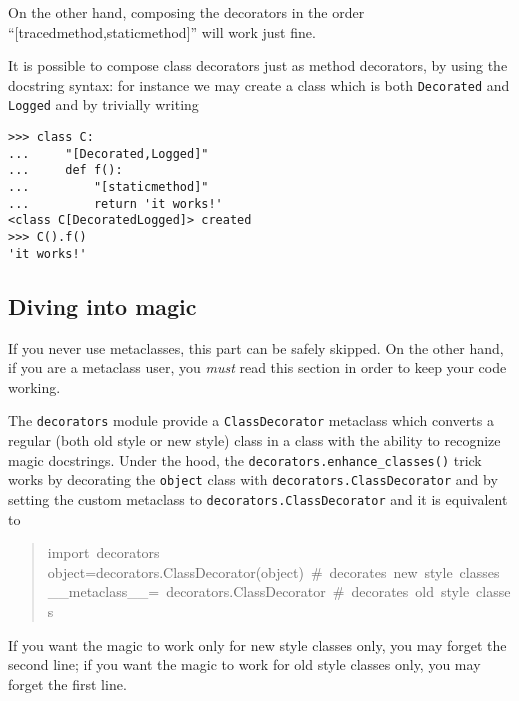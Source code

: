 \documentclass[11pt,english]{article}
\begin{document}
On the other hand, composing the decorators in the order
``[tracedmethod,staticmethod]'' will work just fine.

It is possible to compose class decorators just as method decorators,
by using the docstring syntax: for instance we may create a class
which is both \texttt{Decorated} and \texttt{Logged} and by trivially writing
\begin{verbatim}>>> class C: 
...     "[Decorated,Logged]"
...     def f(): 
...         "[staticmethod]"
...         return 'it works!'
<class C[DecoratedLogged]> created
>>> C().f()
'it works!'\end{verbatim}



\hypertarget{diving-into-magic}{}
\subsection*{Diving into magic}

If you never use metaclasses, this part can be safely skipped. On the
other hand, if you are a metaclass user, you \emph{must} read this section
in order to keep your code working.

The \texttt{decorators} module provide a \texttt{ClassDecorator} metaclass which 
converts a regular (both old style or new style) class in a class with 
the ability to recognize magic docstrings. Under the hood, the 
\texttt{decorators.enhance{\_}classes()} trick works by decorating the 
\texttt{object} class with \texttt{decorators.ClassDecorator} and by setting 
the custom metaclass to \texttt{decorators.ClassDecorator} and it is 
equivalent to
\begin{quote}
\begin{ttfamily}\begin{flushleft}
\mbox{import~decorators}\\
\mbox{object=decorators.ClassDecorator(object)~{\#}~decorates~new~style~classes}\\
\mbox{{\_}{\_}metaclass{\_}{\_}=~decorators.ClassDecorator~{\#}~decorates~old~style~classes}
\end{flushleft}\end{ttfamily}
\end{quote}

If you want the magic to work only for new style classes only, you may 
forget the second line; if you want the magic to work for old style 
classes only, you may forget the first line.
\end{document}
